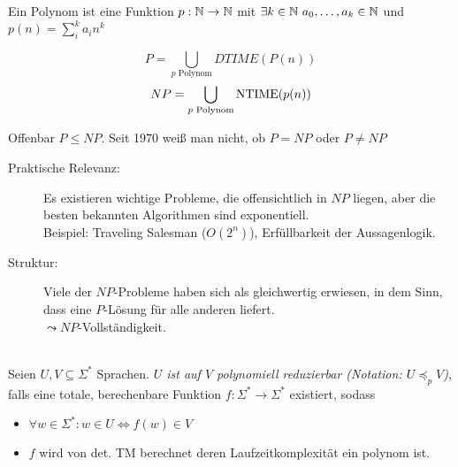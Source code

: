 {\begin{Def}[name={[Polynom]}]
	Ein Polynom ist eine Funktion $p:\N\->\N$ mit $\exists k\in \mathbb{N}\ a_0,\dots,a_k\in\mathbb{N}$ und \mbox{$p(n)=\sum_i^k a_in^k$}
\end{Def}
\begin{Def}
 \[ P = \bigcup_{p\text{ Polynom}} DTIME(P(n)) \]
 \[ NP = \bigcup_{p\text{ Polynom}} \operatorname{NTIME}(p(n)) \]
 
\end{Def}



Offenbar $P\leq NP$. Seit 1970 weiß man nicht, ob $P=NP$ oder $P\neq NP$
\begin{description}
\item[Praktische Relevanz:] Es existieren wichtige Probleme, die offensichtlich in $NP$ liegen, aber die besten bekannten Algorithmen sind exponentiell.\\
	Beispiel: Traveling Salesman ($O(2^n)$), Erfüllbarkeit der Aussagenlogik.
\item[Struktur:] Viele der $NP$-Probleme haben sich als gleichwertig erwiesen, in dem Sinn, dass eine $P$-Lösung für alle anderen liefert.\\
	$\leadsto NP$-Vollständigkeit.
\end{description}
}

\begin{Def}\label{def:PolyReduktion}\ \\
  Seien $U, V \subseteq \Sigma^*$ Sprachen.
  \emph{$U$ ist auf $V$ polynomiell reduzierbar (Notation: $U \preceq_p V$)}, falls eine totale, berechenbare Funktion
  $f:\Sigma^* \to \Sigma^*$ existiert, sodass
  \begin{itemize}
   \item $\forall w \in \Sigma^*:w \in U \iff f(w) \in V$
   \item $f$ wird von det. TM berechnet deren Laufzeitkomplexität ein polynom ist.
  \end{itemize}
\end{Def}

